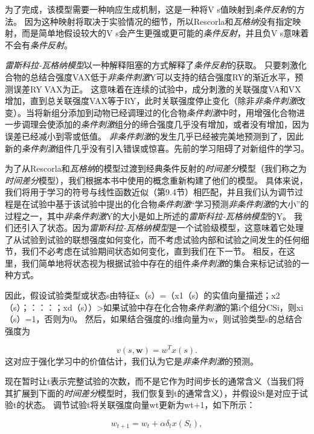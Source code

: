 {为了完成，该模型需要一种响应生成机制，这是一种将V s值映射到\textit{条件反射}的方法。
因为这种映射将取决于实验情况的细节，所以Rescorla和\textit{瓦格纳}没有指定映射，而是简单地假设较大的V s会产生更强或更可能的\textit{条件反射}，并且负V s意味着不会有\textit{条件反射}。


\textit{雷斯科拉-瓦格纳模型}以一种解释阻塞的方式解释了\textit{条件反射}的获取。
只要刺激化合物的总结合强度VAX低于\textit{非条件刺激}Y可以支持的结合强度RY的渐近水平，预测误差RY􀀀VAX为正。
这意味着在连续的试验中，成分刺激的关联强度VA和VX增加，直到总关联强度VAX等于RY，此时关联强度停止变化（除非\textit{非条件刺激}改变）。当将新组分添加到动物已经调理过的化合物\textit{条件刺激}中时，用增强化合物进一步调理会使添加的\textit{条件刺激}组分的缔合强度几乎没有增加，或者没有增加，因为误差已经减小到零或低值。
\textit{非条件刺激}的发生几乎已经被完美地预测到了，因此新的\textit{条件刺激}组件几乎没有引入错误或惊喜。先前的学习阻碍了对新组件的学习。


为了从Rescorla和\textit{瓦格纳}的模型过渡到经典条件反射的\textit{时间差分}模型（我们称之为\textit{时间差分}模型），我们根据本书中使用的概念重新构建了他们的模型。
具体来说，我们将用于学习的符号与线性函数近似（第9.4节）相匹配，并且我们认为调节过程是在试验中基于该试验中提出的化合物\textit{条件刺激}“学习预测\textit{非条件刺激}的大小”的过程之一，其中\textit{非条件刺激}Y的大小是如上所述的\textit{雷斯科拉-瓦格纳模型}的Y。
我们还引入了状态。因为\textit{雷斯科拉-瓦格纳模型}是一个试验级模型，这意味着它处理了从试验到试验的联想强度如何变化，而不考虑试验内部和试验之间发生的任何细节，我们不必考虑在试验期间状态如何变化，直到我们在下一节。
相反，在这里，我们简单地将状态视为根据试验中存在的组件\textit{条件刺激}的集合来标记试验的一种方式。


因此，假设试验类型或状态s由特征x（s）=（x1（s）的实值向量描述；x2（s）；：：：；xd（s））>如果试验中存在化合物\textit{条件刺激}的第i个组分CSi，则xi（s）=1，否则为0。
然后，如果结合强度的d维向量为w，则试验类型s的总结合强度为

\begin{equation}\label{key}
	v(s, \textbf{w}) = 
		w^T x(s).
\end{equation}
这对应于强化学习中的价值估计，我们认为它是\textit{非条件刺激}的预测。

现在暂时让t表示完整试验的次数，而不是它作为时间步长的通常含义（当我们将其扩展到下面的\textit{时间差分}模型时，我们恢复到t的通常含义），并假设St是对应于试验t的状态。
调节试验t将关联强度向量wt更新为wt+1，如下所示：

\begin{equation}\label{key}
	w_{t+1} = w_t + \alpha \delta_t x(S_t),
\end{equation}

}
